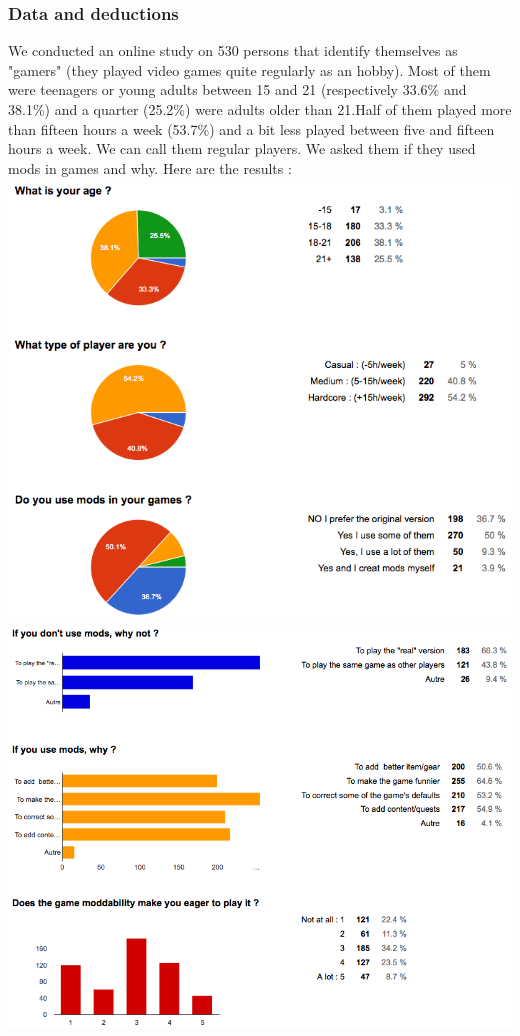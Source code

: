\documentclass[a4paper,12pt]{article}
\begin{document}
\subsubsection{Data and deductions}
We conducted an online study on 530 persons that identify themselves as "gamers" (they played video games quite regularly as an hobby). Most of them were teenagers or young adults between 15 and 21 (respectively 33.6\% and 38.1\%) and a quarter (25.2\%) were adults older than 21.Half of them played more than fifteen hours a week (53.7\%) and a bit less played between five and fifteen hours a week. We can call them regular players.
We asked them if they used mods in games and why. Here are the results : \\
\includegraphics[keepaspectratio=true, width=13.7cm]{./uberCharts1.png}\\
\includegraphics[keepaspectratio=true, width=13.7cm]{./uberCharts2.png}\\
\end{document}
